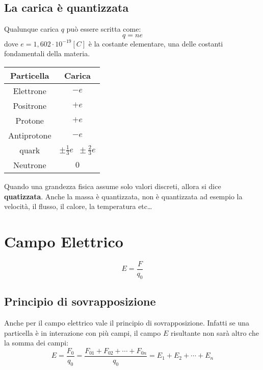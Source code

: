         \subsection{La carica è quantizzata} Qualunque carica $q$ può essere
        scritta come:
            \begin{equation}
                q = ne
            \end{equation}
        dove $e = 1,602\cdot10^{-19} [C]$ è la costante elementare, una delle
        costanti fondamentali della materia.
        \begin{center}
            \begin{tabular}{ |c|c| } 
                \hline
                Particella & Carica \\
                \hline
                Elettrone & $- e$ \\
                Positrone & $+ e$ \\
                Protone & $+ e$ \\
                Antiprotone & $- e$ \\
                quark & $\pm \frac{1}{3}e \;\; \pm \frac{2}{3}e$ \\
                Neutrone & $0$ \\
                \hline
            \end{tabular}
        \end{center}
        Quando una grandezza fisica assume solo valori discreti, allora si dice
        \textbf{quatizzata}. Anche la massa è quantizzata, non è quantizzata ad
        esempio la velocità, il flusso, il calore, la temperatura etc\dots

        \section{Campo Elettrico}
            \begin{equation}
                E = \frac{F}{q_0}
            \end{equation}

            \subsection{Principio di sovrapposizione} Anche per il campo 
            elettrico vale il principio di sovrapposizione. Infatti se una 
            particella è in interazione con più campi, il campo $E$ risultante
            non sarà altro che la somma dei campi:
                \begin{equation}
                    E = \frac{F_0}{q_0} = \frac{F_{01} + F_{02} + \cdots + 
                    F_{0n}}{q_0} = E_1 + E_2 + \cdots + E_n
                \end{equation}

